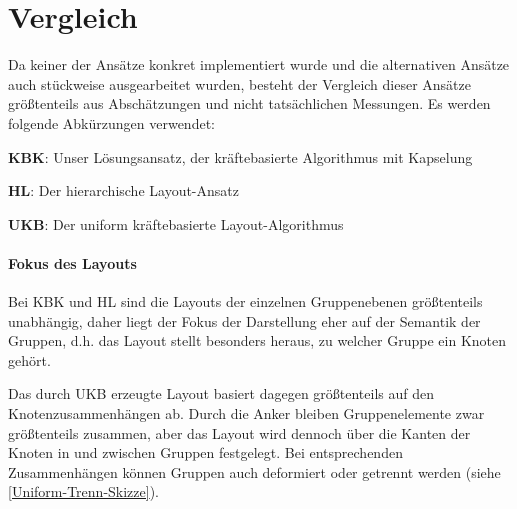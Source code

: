 \section{Vergleich}
\label{Ansatz-Vergleich}
Da keiner der Ansätze konkret implementiert wurde und die alternativen Ansätze auch stückweise ausgearbeitet wurden, besteht der Vergleich dieser Ansätze größtenteils aus Abschätzungen und nicht tatsächlichen Messungen. Es werden folgende Abkürzungen verwendet:

\textbf{KBK}: Unser Lösungsansatz, der kräftebasierte Algorithmus mit Kapselung

\textbf{HL}: Der hierarchische Layout-Ansatz

\textbf{UKB}: Der uniform kräftebasierte Layout-Algorithmus

\paragraph*{Fokus des Layouts}
Bei KBK und HL sind die Layouts der einzelnen Gruppenebenen größtenteils unabhängig, daher liegt der Fokus der Darstellung eher auf der Semantik der Gruppen, d.h. das Layout stellt besonders heraus, zu welcher Gruppe ein Knoten gehört.

Das durch UKB erzeugte Layout basiert dagegen größtenteils auf den Knotenzusammenhängen ab. Durch die Anker bleiben Gruppenelemente zwar größtenteils zusammen, aber das Layout wird dennoch über die Kanten der Knoten in und zwischen Gruppen festgelegt. Bei entsprechenden Zusammenhängen können Gruppen auch deformiert oder getrennt werden (siehe \autoref{Uniform-Trenn-Skizze}).

